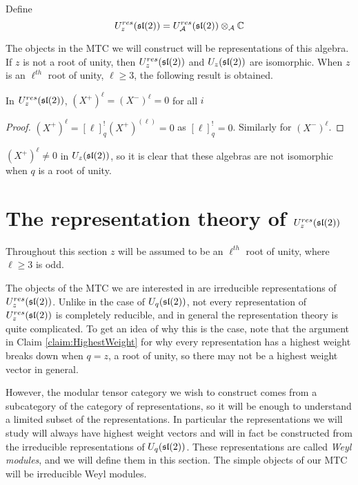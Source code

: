 Define 
\begin{equation}
    U_z^{res}(\mathfrak{sl}(2)) = U_\mathcal{A}^{res}(\mathfrak{sl}(2)) \otimes_\mathcal{A} \mathbb{C}
\end{equation}

The objects in the MTC we will construct will be representations of this
algebra.  If $z$ is not a root of unity, then $U_z^{res}(\mathfrak{sl}(2))$ and
$U_z(\mathfrak{sl}(2))$ are isomorphic. When $z$ is an $\ell^{th}$ root of unity, $\ell
\geq 3$, the following result is obtained.

\begin{lemma}
    In $U_z^{res}(\mathfrak{sl}(2))$, $ (X^+)^\ell = (X^-)^\ell = 0$ for all $i$
\end{lemma}
\begin{proof}
    $ (X^+)^\ell = [\ell]_{q}^!  (X^+)^{(\ell)} = 0$ as $[\ell]_{q}^! = 0$. Similarly for $(X^-)^\ell$.
\end{proof}

$(X^+)^\ell \neq 0$ in $U_z(\mathfrak{sl}(2))$, so it is clear that these algebras are
not isomorphic when $q$ is a root of unity. 

\section{The representation theory of $U_z^{res}(\mathfrak{sl}(2))$}
\label{section:RepTheoryofResSL2}


Throughout this section $z$ will be assumed to be an $\ell^{th}$ root of unity, where $\ell \geq 3$ is odd.

The objects of the MTC we are interested in are irreducible representations of
$U_z^{res}(\mathfrak{sl}(2))$. Unlike in the case of $U_q(\mathfrak{sl}(2))$, not every
representation of $U_z^{res}(\mathfrak{sl}(2))$ is completely reducible, and in general
the representation theory is quite complicated. To get an idea of why this is
the case, note that the argument in Claim \ref{claim:HighestWeight} for why every
representation has a highest weight breaks down when $q=z$, a root of unity,
so there may not be a highest weight vector in general. 

However, the modular tensor category we wish to construct comes from a
subcategory of the category of representations, so it will be enough to
understand a limited subset of the representations.  In particular the
representations we will study will always have highest weight vectors and will
in fact be constructed from the irreducible representations of $U_q(\mathfrak{sl}(2))$.
These representations are called  \emph{Weyl modules}, and we will define them
in this section. The simple objects of our MTC will be irreducible Weyl modules. 

